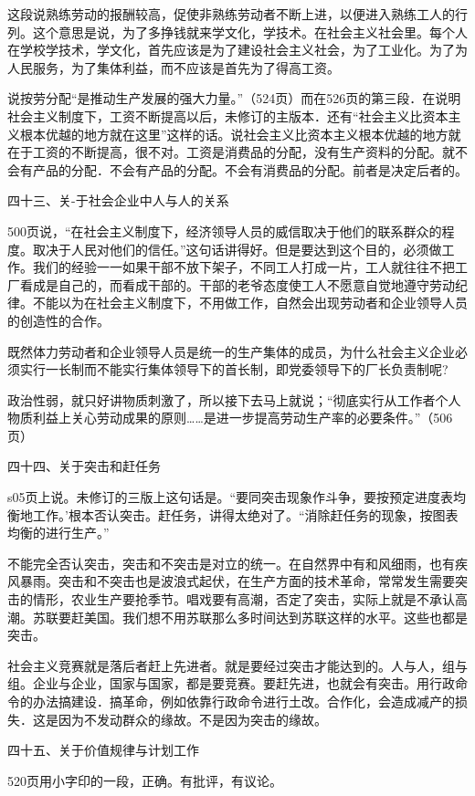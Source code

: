 这段说熟练劳动的报酬较高，促使非熟练劳动者不断上进，以便进入熟练工人的行列。这个意思是说，为了多挣钱就来学文化，学技术。在社会主义社会里。每个人在学校学技术，学文化，首先应该是为了建设社会主义社会，为了工业化。为了为人民服务，为了集体利益，而不应该是首先为了得高工资。

说按劳分配“是推动生产发展的强大力量。”（524页）而在526页的第三段．在说明社会主义制度下，工资不断提高以后，未修订的主版本．还有“社会主义比资本主义根本优越的地方就在这里”这样的话。说社会主义比资本主义根本优越的地方就在于工资的不断提高，很不对。工资是消费品的分配，没有生产资料的分配。就不会有产品的分配．不会有产品的分配。不会有消费品的分配。前者是决定后者的。

四十三、关-于社会企业中人与人的关系

500页说，“在社会主义制度下，经济领导人员的威信取决于他们的联系群众的程度。取决于人民对他们的信任。”这句话讲得好。但是要达到这个目的，必须做工作。我们的经验一一如果干部不放下架子，不同工人打成一片，工人就往往不把工厂看成是自己的，而看成干部的。干部的老爷态度使工人不愿意自觉地遵守劳动纪律。不能以为在社会主义制度下，不用做工作，自然会出现劳动者和企业领导人员的创造性的合作。

既然体力劳动者和企业领导人员是统一的生产集体的成员，为什么社会主义企业必须实行一长制而不能实行集体领导下的首长制，即党委领导下的厂长负责制呢?

政治性弱，就只好讲物质刺激了，所以接下去马上就说；“彻底实行从工作者个人物质利益上关心劳动成果的原则……是进一步提高劳动生产率的必要条件。”（506页）

四十四、关于突击和赶任务

s05页上说。未修订的三版上这句话是。“要同突击现象作斗争，要按预定进度表均衡地工作。’根本否认突击。赶任务，讲得太绝对了。“消除赶任务的现象，按图表均衡的进行生产。”

不能完全否认突击，突击和不突击是对立的统一。在自然界中有和风细雨，也有疾风暴雨。突击和不突击也是波浪式起伏，在生产方面的技术革命，常常发生需要突击的情形，农业生产要抢季节。唱戏要有高潮，否定了突击，实际上就是不承认高潮。苏联要赶美国。我们想不用苏联那么多时间达到苏联这样的水平。这些也都是突击。

社会主义竞赛就是落后者赶上先进者。就是要经过突击才能达到的。人与人，组与组。企业与企业，国家与国家，都是要竞赛。要赶先进，也就会有突击。用行政命令的办法搞建设．搞革命，例如依靠行政命令进行土改。合作化，会造成减产的损失．这是因为不发动群众的缘故。不是因为突击的缘故。

四十五、关于价值规律与计划工作

520页用小字印的一段，正确。有批评，有议论。


